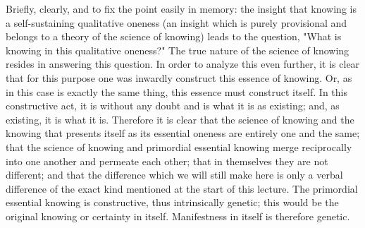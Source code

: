 \documentclass{article}
\begin{document}
Briefly, clearly, and to fix the point easily in memory:
the insight that knowing is a self-sustaining qualitative oneness
(an insight which is purely provisional
and belongs to a theory of the science of knowing) 
leads to the question,
"What is knowing in this qualitative oneness?"
The true nature of the science of knowing resides in answering this question.
In order to analyze this even further, it is clear that for this purpose
one was inwardly construct this essence of knowing.
Or, as in this case is exactly the same thing,
this essence must construct itself.
In this constructive act, it is without any doubt
and is what it is as existing;
and, as existing, it is what it is.
Therefore it is clear that the science of knowing
and the knowing that presents itself as its essential oneness 
are entirely one and the same;
that the science of knowing and primordial essential knowing
merge reciprocally into one another and permeate each other;
that in themselves they are not different;
and that the difference which we will still make here
is only a verbal difference of the exact kind mentioned
at the start of this lecture.
The primordial essential knowing is constructive,
thus intrinsically genetic;
this would be the original knowing or certainty in itself.
Manifestness in itself is therefore genetic.
\end{document}
